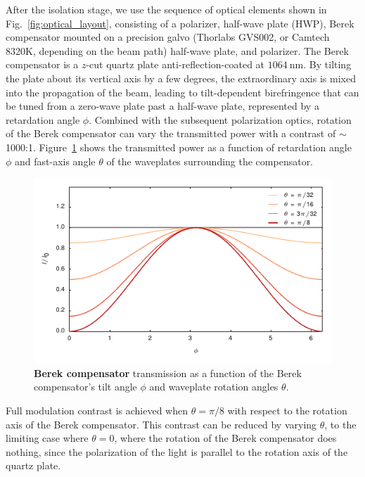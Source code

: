 \documentclass[twocolumn,aps,pra,showpacs,preprintnumbers,bibnotes]{revtex4-1}
\newcommand\unit[2]{\ensuremath{#1~\mathrm{{#2}}}}
\begin{document}
After the isolation stage, we use the sequence of optical elements shown in Fig.~\ref{fig:optical_layout}, consisting of a polarizer, half-wave plate (HWP), Berek compensator mounted on a precision galvo (Thorlabs GVS002, or Camtech 8320K, depending on the beam path) half-wave plate, and polarizer.
The Berek compensator is a $z$-cut quartz plate anti-reflection-coated at \unit{1064}{nm}.
By tilting the plate about its vertical axis by a few degrees, the extraordinary axis is mixed into the propagation of the beam, leading to  tilt-dependent birefringence that can be tuned from a zero-wave plate past a half-wave plate, represented by a retardation angle $\phi$.
Combined with the subsequent polarization optics, rotation of the Berek compensator can vary the transmitted power with a contrast of $\sim$1000:1.
Figure~\ref{fig:berek} shows the transmitted power as a function of retardation angle $\phi$ and fast-axis angle $\theta$ of the waveplates surrounding the compensator.
\begin{figure}
  \begin{center}
    \includegraphics{Figure4.pdf}
    \caption{\textbf{Berek compensator} transmission as a function of the Berek compensator's tilt angle $\phi$ and waveplate rotation angles $\theta$.}
    \label{fig:berek}
  \end{center}
\end{figure}

Full modulation contrast is achieved when $\theta=\pi/8$ with respect to the rotation axis of the Berek compensator.
This contrast can be reduced by varying $\theta$, to the limiting case where $\theta=0$, where the rotation of the Berek compensator does nothing, since the polarization of the light is parallel to the rotation axis of the quartz plate.
\end{document}

